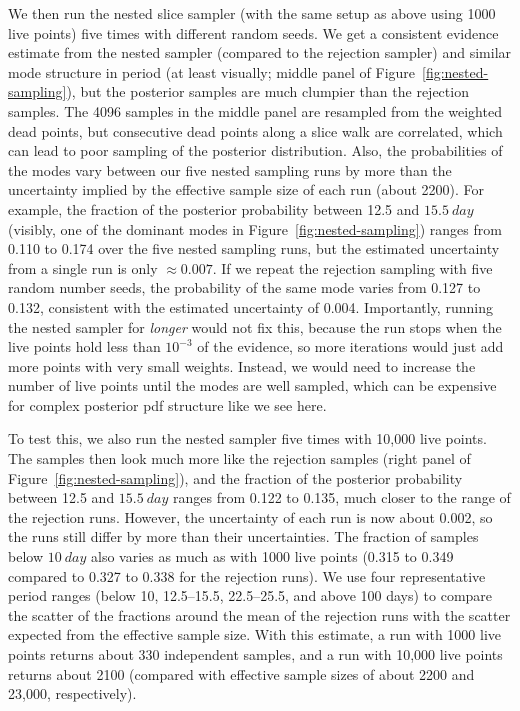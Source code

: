 \documentclass[twocolumn]{AASTeX7/aastex701}
\begin{document}
We then run the nested slice sampler (with the same setup as above using 1000 live
points) five times with different random seeds.
We get a consistent evidence estimate from the nested sampler (compared to the rejection
sampler) and similar mode structure in period (at least visually; middle panel of
Figure~\ref{fig:nested-sampling}), but the posterior samples are much clumpier than the
rejection samples.
The 4096 samples in the middle panel are resampled from the weighted dead points, but
consecutive dead points along a slice walk are correlated, which can lead to poor
sampling of the posterior distribution.
Also, the probabilities of the modes vary between our five nested sampling runs by more
than the uncertainty implied by the effective sample size of each run (about 2200).
For example, the fraction of the posterior probability between 12.5 and
$15.5~\unit{day}$ (visibly, one of the dominant modes in
Figure~\ref{fig:nested-sampling}) ranges from 0.110 to 0.174 over the five nested
sampling runs, but the estimated uncertainty from a single run is only $\approx 0.007$.
If we repeat the rejection sampling with five random number seeds, the probability of
the same mode varies from 0.127 to 0.132, consistent with the estimated uncertainty of
0.004.
Importantly, running the nested sampler for \emph{longer} would not fix this, because
the run stops when the live points hold less than $10^{-3}$ of the evidence, so more
iterations would just add more points with very small weights.
Instead, we would need to increase the number of live points until the modes are well
sampled, which can be expensive for complex posterior pdf structure like we see here.

To test this, we also run the nested sampler five times with 10,000 live points.
The samples then look much more like the rejection samples (right panel of
Figure~\ref{fig:nested-sampling}), and the fraction of the posterior probability between
12.5 and $15.5~\unit{day}$ ranges from 0.122 to 0.135, much closer to the range of the
rejection runs.
However, the uncertainty of each run is now about 0.002, so the runs still differ by
more than their uncertainties.
The fraction of samples below $10~\unit{day}$ also varies as much as with 1000 live
points (0.315 to 0.349 compared to 0.327 to 0.338 for the rejection runs).
We use four representative period ranges (below 10, 12.5--15.5, 22.5--25.5, and above
100 days) to compare the scatter of the fractions around the mean of the rejection runs
with the scatter expected from the effective sample size.
With this estimate, a run with 1000 live points returns about 330 independent samples,
and a run with 10,000 live points returns about 2100 (compared with effective sample
sizes of about 2200 and 23,000, respectively).
\end{document}
